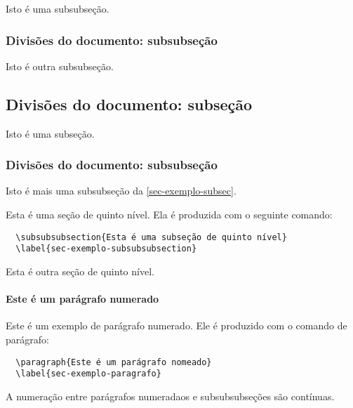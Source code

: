 \documentclass[article,12pt,oneside,a4paper,chapter=TITLE,
			   english,brazil]{abntex2}
\begin{document}
\begin{anexosenv}
Isto é uma subsubseção.

\subsubsection{Divisões do documento: subsubseção}

Isto é outra subsubseção.

\subsection{Divisões do documento: subseção}\label{sec-exemplo-subsec}

Isto é uma subseção.

\subsubsection{Divisões do documento: subsubseção}

Isto é mais uma subsubseção da \autoref{sec-exemplo-subsec}.


\label{sec-exemplo-subsubsubsection}

Esta é uma seção de quinto nível. Ela é produzida com o seguinte comando:
\begin{verbatim}
  \subsubsubsection{Esta é uma subseção de quinto nível}
  \label{sec-exemplo-subsubsubsection}
\end{verbatim}

\label{sec-exemplo-subsubsubsection-outro}

Esta é outra seção de quinto nível.

\paragraph{Este é um parágrafo numerado}\label{sec-exemplo-paragrafo}

Este é um exemplo de parágrafo numerado. Ele é produzido com o comando de parágrafo:
\begin{verbatim}
  \paragraph{Este é um parágrafo nomeado}
  \label{sec-exemplo-paragrafo}
\end{verbatim}

A numeração entre parágrafos numeradaos e subsubsubseções são contínuas.


\end{anexosenv}
\end{document}
